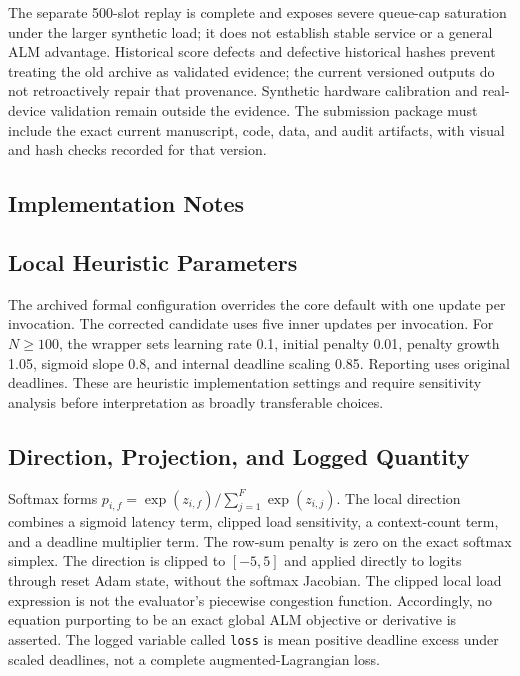 \documentclass[pdflatex,sn-mathphys-num]{sn-jnl}
\begin{document}
The separate 500-slot replay is complete and exposes severe queue-cap saturation under the larger synthetic load; it does not establish stable service or a general ALM advantage. Historical score defects and defective historical hashes prevent treating the old archive as validated evidence; the current versioned outputs do not retroactively repair that provenance. Synthetic hardware calibration and real-device validation remain outside the evidence. The submission package must include the exact current manuscript, code, data, and audit artifacts, with visual and hash checks recorded for that version.



\begin{appendices}
\section{Implementation Notes}

\subsection{Local Heuristic Parameters}
The archived formal configuration overrides the core default with one update per invocation. The corrected candidate uses five inner updates per invocation. For $N\ge100$, the wrapper sets learning rate 0.1, initial penalty 0.01, penalty growth 1.05, sigmoid slope 0.8, and internal deadline scaling 0.85. Reporting uses original deadlines. These are heuristic implementation settings and require sensitivity analysis before interpretation as broadly transferable choices.

\subsection{Direction, Projection, and Logged Quantity}
Softmax forms $p_{i,f}=\exp(z_{i,f})/\sum_{j=1}^{F}\exp(z_{i,j})$. The local direction combines a sigmoid latency term, clipped load sensitivity, a context-count term, and a deadline multiplier term. The row-sum penalty is zero on the exact softmax simplex. The direction is clipped to $[-5,5]$ and applied directly to logits through reset Adam state, without the softmax Jacobian. The clipped local load expression is not the evaluator's piecewise congestion function. Accordingly, no equation purporting to be an exact global ALM objective or derivative is asserted. The logged variable called \texttt{loss} is mean positive deadline excess under scaled deadlines, not a complete augmented-Lagrangian loss.


\end{appendices}
\end{document}
